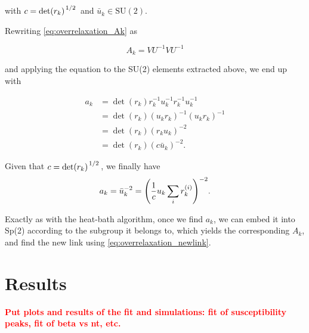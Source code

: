 \documentclass[reqno,12pt]{article}
\numberwithin{equation}{section}
\newcommand{\red}[1]{\textbf{\textcolor{red}{#1}}}
\newcommand{\SU}{\mathrm{SU}}
\begin{document}
with $c = \det(r_k)^{\flatfrac{1}{2}}$ and $\bar{u}_k \in \SU(2)$.

Rewriting \eqref{eq:overrelaxation_Ak} as

\begin{equation}
	A_k = V U^{-1} V U^{-1}
\end{equation}

and applying the equation to the SU(2) elements extracted above, we end up with

\begin{equation}
	\begin{aligned}
		a_k &= \det(r_k) r_k^{-1} u_k^{-1} r_k^{-1} u_k^{-1} \\
		&= \det(r_k) (u_k r_k)^{-1} (u_k r_k)^{-1} \\
		&= \det(r_k) (r_k u_k)^{-2} \\
		&= \det(r_k) (c \bar{u}_k)^{-2}.
	\end{aligned}
\end{equation}

Given that $c = \det(r_k)^{\flatfrac{1}{2}}$, we finally have
\begin{equation}
	a_k = \bar{u}_k^{-2} = \qty(\frac{1}{c} u_k \sum_i r_k^{(i)})^{-2}.
\end{equation}

Exactly as with the heat-bath algorithm, once we find $a_k$, we can embed it into Sp(2) according to the
subgroup it belongs to, which yields the corresponding $A_k$, and find the new link using \eqref{eq:overrelaxation_newlink}.

\section{Results}
\red{Put plots and results of the fit and simulations: fit of susceptibility peaks, fit of beta vs nt, etc.}

\printbibliography
\end{document}
